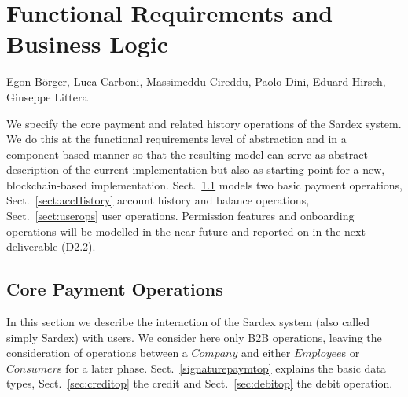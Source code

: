 \chapter{Functional Requirements and Business Logic}
\label{ch:funreq}


\vspace{-1cm}
\begin{center}
Egon B\"orger, Luca Carboni, Massimeddu Cireddu, Paolo Dini, Eduard Hirsch, Giuseppe Littera
\end{center}


We specify the core payment and related history operations of the Sardex system. We do this at the functional requirements  level of abstraction and in a component-based manner so that the resulting model can serve as abstract description of the current implementation but also as starting point for a new, blockchain-based implementation. Sect.~\ref{sect:paymtops} models  two basic payment operations, Sect.~\ref{sect:accHistory} account history and balance operations, Sect.~\ref{sect:userops} user operations. Permission features and onboarding operations will be modelled in the near future and reported on in the next deliverable (D2.2).


\section{Core Payment Operations}
\label{sect:paymtops}

In this section we describe the interaction of the Sardex system (also called simply Sardex)  with users. We consider here only B2B operations, leaving the consideration of operations between a $Company$ and either $Employee$s or $Consumer$s for a later phase. Sect.~\ref{signaturepaymtop} explains the basic data types,  Sect.~\ref{sec:creditop} the credit and  Sect.~\ref{sec:debitop} the debit operation.

